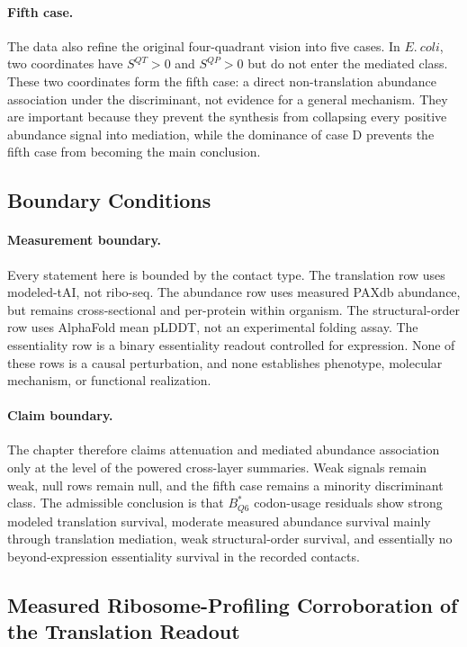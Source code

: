 \paragraph{Fifth case.}
The data also refine the original four-quadrant vision into five cases.  In $E.\ coli$, two coordinates have $S^{QT}>0$ and $S^{QP}>0$ but do not enter the mediated class.  These two coordinates form the fifth case: a direct non-translation abundance association under the discriminant, not evidence for a general mechanism.  They are important because they prevent the synthesis from collapsing every positive abundance signal into mediation, while the dominance of case D prevents the fifth case from becoming the main conclusion.

\subsection{Boundary Conditions}

\paragraph{Measurement boundary.}
Every statement here is bounded by the contact type.  The translation row uses modeled-tAI, not ribo-seq.  The abundance row uses measured PAXdb abundance, but remains cross-sectional and per-protein within organism.  The structural-order row uses AlphaFold mean pLDDT, not an experimental folding assay.  The essentiality row is a binary essentiality readout controlled for expression.  None of these rows is a causal perturbation, and none establishes phenotype, molecular mechanism, or functional realization.

\paragraph{Claim boundary.}
The chapter therefore claims attenuation and mediated abundance association only at the level of the powered cross-layer summaries.  Weak signals remain weak, null rows remain null, and the fifth case remains a minority discriminant class.  The admissible conclusion is that $B^*_{Q6}$ codon-usage residuals show strong modeled translation survival, moderate measured abundance survival mainly through translation mediation, weak structural-order survival, and essentially no beyond-expression essentiality survival in the recorded contacts.

\subsection{Measured Ribosome-Profiling Corroboration of the Translation Readout}

